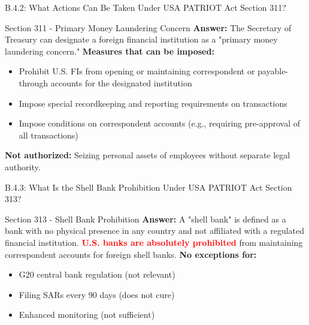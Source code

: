 \documentclass{beamer}
\begin{document}
	\begin{frame}{B.4.2: What Actions Can Be Taken Under USA PATRIOT Act Section 311?}
		\begin{block}{Section 311 - Primary Money Laundering Concern}
			\textbf{Answer:} The Secretary of Treasury can designate a foreign financial institution as a "primary money laundering concern."
			\vspace{0.2cm}
			\textbf{Measures that can be imposed:}
			\begin{itemize}
				\item Prohibit U.S. FIs from opening or maintaining correspondent or payable-through accounts for the designated institution
				\item Impose special recordkeeping and reporting requirements on transactions
				\item Impose conditions on correspondent accounts (e.g., requiring pre-approval of all transactions)
			\end{itemize}
			\textbf{Not authorized:} Seizing personal assets of employees without separate legal authority.
		\end{block}
	\end{frame}
	
	\begin{frame}{B.4.3: What Is the Shell Bank Prohibition Under USA PATRIOT Act Section 313?}
		\begin{block}{Section 313 - Shell Bank Prohibition}
			\textbf{Answer:} A "shell bank" is defined as a bank with no physical presence in any country and not affiliated with a regulated financial institution.
			\vspace{0.2cm}
			\textcolor{red}{\textbf{U.S. banks are absolutely prohibited}} from maintaining correspondent accounts for foreign shell banks.
			\vspace{0.2cm}
			\textbf{No exceptions for:}
			\begin{itemize}
				\item G20 central bank regulation (not relevant)
				\item Filing SARs every 90 days (does not cure)
				\item Enhanced monitoring (not sufficient)
			\end{itemize}
		\end{block}
	\end{frame}
	
\end{document}
